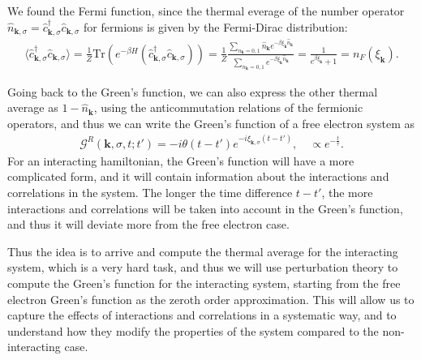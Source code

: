 \begin{example}
    We found the Fermi function, since the thermal everage of the number operator \(\hat{n}_{\mathbf{k}, \sigma} = \hat{c}_{\mathbf{k}, \sigma}^\dagger \hat{c}_{\mathbf{k}, \sigma}\) for fermions is given by the Fermi-Dirac distribution:
    \[
        \begin{aligned}
            \langle \hat{c}_{\mathbf{k}, \sigma}^\dagger \hat{c}_{\mathbf{k}, \sigma} \rangle = \frac{1}{Z} \mathrm{Tr} \left( e^{-\beta H} (\hat{c}_{\mathbf{k}, \sigma}^\dagger \hat{c}_{\mathbf{k}, \sigma}) \right) = \frac{1}{Z}  \frac{\sum_{n_{\mathbf{k}}=0,1} \hat{n}_{\mathbf{k}} e^{-\beta \xi_{\mathbf{k}} \hat{n}_{\mathbf{k}}}}{\sum_{n_{\mathbf{k}}=0,1} e^{-\beta \xi_{\mathbf{k}} \hat{n}_{\mathbf{k}}}} = \frac{1}{e^{\beta \xi_{\mathbf{k}}} + 1} = n_F(\xi_{\mathbf{k}}).
        \end{aligned}
    \]

    Going back to the Green's function, we can also express the other thermal average as \(1-\hat{n}_{\mathbf{k}}\), using the anticommutation relations of the fermionic operators, and thus we can write the Green's function of a free electron system as
    \[
        \begin{aligned}
            \mathcal{G}^R(\mathbf{k}, \sigma, t; t') = -i \theta(t - t') e^{-i \xi_{\mathbf{k},\sigma} (t - t')}, \quad \propto e^{-\frac{t}{\tau}}.
        \end{aligned}
    \]
    For an interacting hamiltonian, the Green's function will have a more complicated form, and it will contain information about the interactions and correlations in the system. The longer the time difference \(t - t'\), the more interactions and correlations will be taken into account in the Green's function, and thus it will deviate more from the free electron case.
\end{example}

Thus the idea is to arrive and compute the thermal average for the interacting system, which is a very hard task, and thus we will use perturbation theory to compute the Green's function for the interacting system, starting from the free electron Green's function as the zeroth order approximation. This will allow us to capture the effects of interactions and correlations in a systematic way, and to understand how they modify the properties of the system compared to the non-interacting case.

